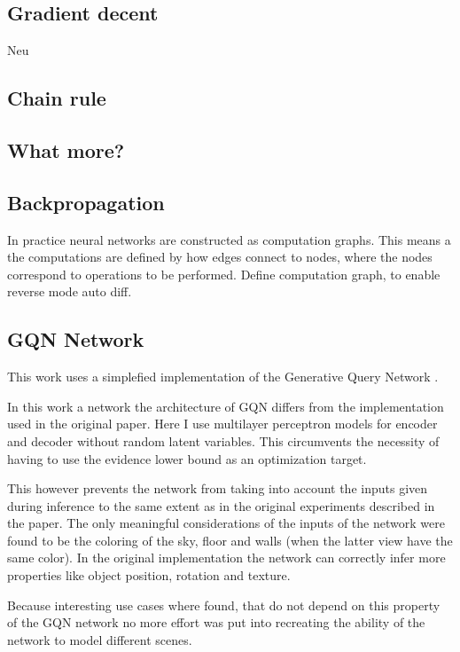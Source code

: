 \subsection{Gradient decent}
Neu

\subsection{Chain rule}
\subsection{What more?}


\subsection{Backpropagation}
In practice neural networks are constructed as computation graphs. This means a the computations are defined by how edges connect to nodes, where the nodes correspond to operations to be performed.
Define computation graph, to enable reverse mode auto diff.

\subsection{GQN Network}
This work uses a simplefied implementation of the Generative Query Network \cite{gqn}.

In this work a network the architecture of GQN differs from the implementation used in the original paper. Here I use multilayer perceptron models for encoder and decoder without random latent variables. This circumvents the necessity of having to use the evidence lower bound as an optimization target.

This however prevents the network from taking into account the inputs given during inference to the same extent as in the original experiments described in the paper. The only meaningful considerations of the inputs of the network were found to be the coloring of the sky, floor and walls (when the latter view have the same color). In the original implementation the network can correctly infer more properties like object position, rotation and texture.

Because interesting use cases where found, that do not depend on this property of the GQN network no more effort was put into recreating the ability of the network to model different scenes.
